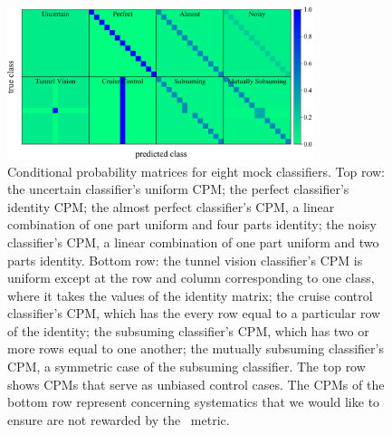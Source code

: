 \begin{figure}
	\begin{center}
    \includegraphics[width=0.8\textwidth]{./fig/all_sim_cm.png}
		\caption{Conditional probability matrices for eight mock classifiers.
		Top row:
		the uncertain classifier's uniform CPM;
		the perfect classifier's identity CPM;
		the almost perfect classifier's CPM, a linear combination of one part uniform and four parts identity;
		the noisy classifier's CPM, a linear combination of one part uniform and two parts identity.
		Bottom row:
		the tunnel vision classifier's CPM is uniform except at the row and column corresponding to one class, where it takes the values of the identity matrix;
		the cruise control classifier's CPM, which has the every row equal to a particular row of the identity;
		the subsuming classifier's CPM, which has two or more rows equal to one another;
		the mutually subsuming classifier's CPM, a symmetric case of the subsuming classifier.
		The top row shows CPMs that serve as unbiased control cases.
		The CPMs of the bottom row represent concerning systematics that we would like to ensure are not rewarded by the \plasticc\ metric.
		}
		\label{fig:mock_cm}
	\end{center}
\end{figure}

